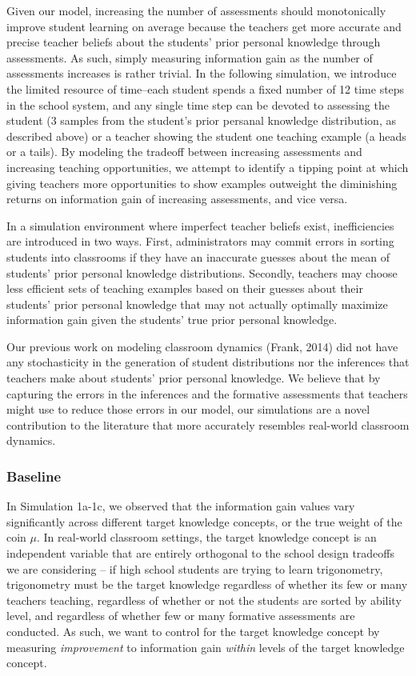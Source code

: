 \documentclass[10pt, letterpaper]{apa6}
\begin{document}
Given our model, increasing the number of assessments should
monotonically improve student learning on average because the teachers
get more accurate and precise teacher beliefs about the students' prior
personal knowledge through assessments. As such, simply measuring
information gain as the number of assessments increases is rather
trivial. In the following simulation, we introduce the limited resource
of time--each student spends a fixed number of 12 time steps in the
school system, and any single time step can be devoted to assessing the
student (3 samples from the student's prior persanal knowledge
distribution, as described above) or a teacher showing the student one
teaching example (a heads or a tails). By modeling the tradeoff between
increasing assessments and increasing teaching opportunities, we attempt
to identify a tipping point at which giving teachers more opportunities
to show examples outweight the diminishing returns on information gain
of increasing assessments, and vice versa.

In a simulation environment where imperfect teacher beliefs exist,
inefficiencies are introduced in two ways. First, administrators may
commit errors in sorting students into classrooms if they have an
inaccurate guesses about the mean of students' prior personal knowledge
distributions. Secondly, teachers may choose less efficient sets of
teaching examples based on their guesses about their students' prior
personal knowledge that may not actually optimally maximize information
gain given the students' true prior personal knowledge.

Our previous work on modeling classroom dynamics (Frank, 2014) did not
have any stochasticity in the generation of student distributions nor
the inferences that teachers make about students' prior personal
knowledge. We believe that by capturing the errors in the inferences and
the formative assessments that teachers might use to reduce those errors
in our model, our simulations are a novel contribution to the literature
that more accurately resembles real-world classroom dynamics.

\subsubsection{Baseline}\label{baseline}

In Simulation 1a-1c, we observed that the information gain values vary
significantly across different target knowledge concepts, or the true
weight of the coin \(\mu\). In real-world classroom settings, the target
knowledge concept is an independent variable that are entirely
orthogonal to the school design tradeoffs we are considering -- if high
school students are trying to learn trigonometry, trigonometry must be
the target knowledge regardless of whether its few or many teachers
teaching, regardless of whether or not the students are sorted by
ability level, and regardless of whether few or many formative
assessments are conducted. As such, we want to control for the target
knowledge concept by measuring \emph{improvement} to information gain
\emph{within} levels of the target knowledge concept.
\end{document}
